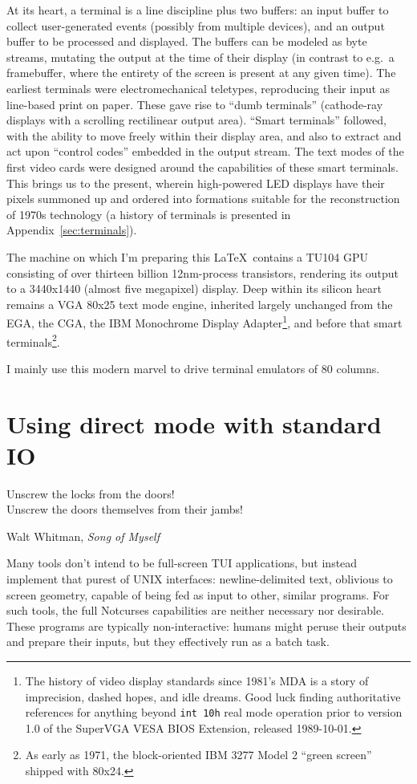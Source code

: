 \documentclass[letterpaper,10pt]{article}
\begin{document}
At its heart, a terminal is a line discipline plus two buffers: an input buffer
to collect user-generated events (possibly from multiple devices), and an
output buffer to be processed and displayed. The buffers can be modeled as byte
streams, mutating the output at the time of their display (in contrast to e.g.\
a framebuffer, where the entirety of the screen is present at any given time).
The earliest terminals were electromechanical teletypes, reproducing their
input as line-based print on paper. These gave rise to ``dumb terminals''
(cathode-ray displays with a scrolling rectilinear output area). ``Smart
terminals'' followed, with the ability to move freely within their display
area, and also to extract and act upon ``control codes'' embedded in the output
stream. The text modes of the first video cards were designed around the
capabilities of these smart terminals. This brings us to the present, wherein
high-powered LED displays have their pixels summoned up and ordered into
formations suitable for the reconstruction of 1970s technology (a history of
terminals is presented in Appendix~\ref{sec:terminals}).

The machine on which I'm preparing this \LaTeX\ contains a
TU104 GPU consisting of over thirteen billion 12nm-process transistors,
rendering its output to a 3440x1440 (almost five megapixel) display. Deep
within its silicon heart remains a VGA 80x25 text mode engine\cite{vga}, inherited
largely unchanged from the EGA, the CGA, the IBM Monochrome Display Adapter\footnote{The
history of video display standards since 1981's MDA is a story of imprecision,
dashed hopes, and idle dreams. Good luck finding authoritative references
for anything beyond \texttt{int 10h} real mode operation prior to version 1.0
of the SuperVGA VESA BIOS Extension\cite{videostandards}, released 1989-10-01\cite{vesa}.},
and before that smart terminals\footnote{As early as 1971, the block-oriented
IBM 3277 Model 2 ``green screen'' shipped with 80x24.}.


I mainly use this modern marvel to drive terminal emulators of 80 columns.

\newpage

\section{Using direct mode with standard I\/O}
\label{sec:direct}
\epigraph{Unscrew the locks from the doors!\\Unscrew the doors themselves from their jambs!}{Walt Whitman, \textit{Song of Myself}}
Many tools don't intend to be full-screen TUI applications, but instead
implement that purest of UNIX interfaces: newline-delimited text, oblivious
to screen geometry, capable of being fed as input to other, similar programs.
For such tools, the full Notcurses capabilities are neither necessary nor
desirable. These programs are typically non-interactive: humans might peruse
their outputs and prepare their inputs, but they effectively run as a batch
task.
\end{document}
